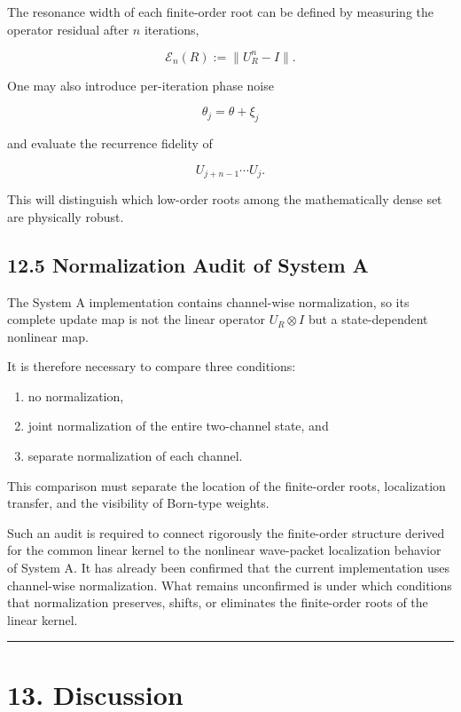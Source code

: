 \documentclass[
  a4paper,
  10pt]{article}
\providecommand{\tightlist}{%
  \setlength{\itemsep}{0pt}\setlength{\parskip}{0pt}}
\begin{document}
The resonance width of each finite-order root can be defined by
measuring the operator residual after \(n\) iterations,

\[
\mathcal E_n(R)
:=
\|U_R^n-I\|.
\]

One may also introduce per-iteration phase noise

\[
\theta_j=\theta+\xi_j
\]

and evaluate the recurrence fidelity of

\[
U_{j+n-1}\cdots U_j.
\]

This will distinguish which low-order roots among the mathematically
dense set are physically robust.

\subsection{12.5 Normalization Audit of System
A}\label{125-normalization-audit-of-system-a}

The System A implementation contains channel-wise normalization, so its
complete update map is not the linear operator \(U_R\otimes I\) but a
state-dependent nonlinear map.

It is therefore necessary to compare three conditions:

\begin{enumerate}
\def\labelenumi{\arabic{enumi}.}
\tightlist
\item
  no normalization,
\item
  joint normalization of the entire two-channel state, and
\item
  separate normalization of each channel.
\end{enumerate}

This comparison must separate the location of the finite-order roots,
localization transfer, and the visibility of Born-type weights.

Such an audit is required to connect rigorously the finite-order
structure derived for the common linear kernel to the nonlinear
wave-packet localization behavior of System A. It has already been
confirmed that the current implementation uses channel-wise
normalization. What remains unconfirmed is under which conditions that
normalization preserves, shifts, or eliminates the finite-order roots of
the linear kernel.

\begin{center}\rule{0.5\linewidth}{0.5pt}\end{center}

\section{13. Discussion}\label{13-discussion}
\end{document}
